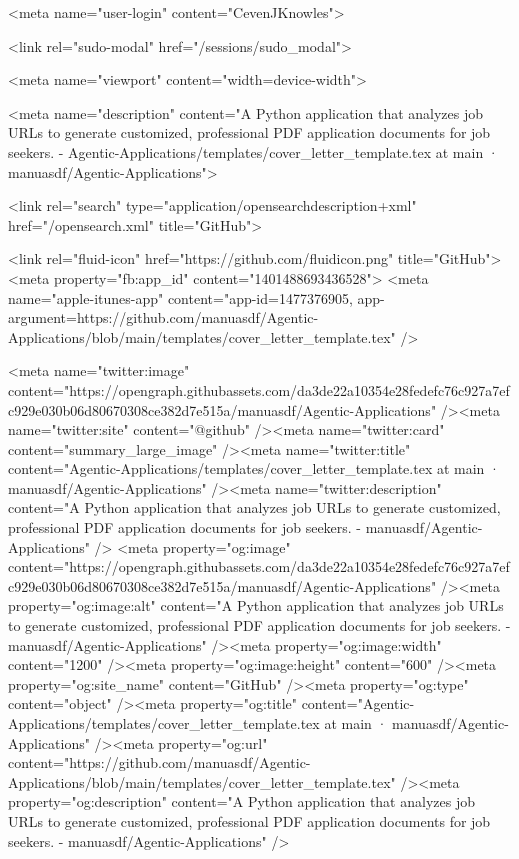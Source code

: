   




    <meta name="user-login" content="CevenJKnowles">

  <link rel="sudo-modal" href="/sessions/sudo_modal">

    <meta name="viewport" content="width=device-width">

    

      <meta name="description" content="A Python application that analyzes job URLs to generate customized, professional PDF application documents for job seekers. - Agentic-Applications/templates/cover_letter_template.tex at main · manuasdf/Agentic-Applications">

      <link rel="search" type="application/opensearchdescription+xml" href="/opensearch.xml" title="GitHub">

    <link rel="fluid-icon" href="https://github.com/fluidicon.png" title="GitHub">
    <meta property="fb:app_id" content="1401488693436528">
    <meta name="apple-itunes-app" content="app-id=1477376905, app-argument=https://github.com/manuasdf/Agentic-Applications/blob/main/templates/cover_letter_template.tex" />

      <meta name="twitter:image" content="https://opengraph.githubassets.com/da3de22a10354e28fedefc76c927a7efc929e030b06d80670308ce382d7e515a/manuasdf/Agentic-Applications" /><meta name="twitter:site" content="@github" /><meta name="twitter:card" content="summary_large_image" /><meta name="twitter:title" content="Agentic-Applications/templates/cover_letter_template.tex at main · manuasdf/Agentic-Applications" /><meta name="twitter:description" content="A Python application that analyzes job URLs to generate customized, professional PDF application documents for job seekers. - manuasdf/Agentic-Applications" />
  <meta property="og:image" content="https://opengraph.githubassets.com/da3de22a10354e28fedefc76c927a7efc929e030b06d80670308ce382d7e515a/manuasdf/Agentic-Applications" /><meta property="og:image:alt" content="A Python application that analyzes job URLs to generate customized, professional PDF application documents for job seekers. - manuasdf/Agentic-Applications" /><meta property="og:image:width" content="1200" /><meta property="og:image:height" content="600" /><meta property="og:site_name" content="GitHub" /><meta property="og:type" content="object" /><meta property="og:title" content="Agentic-Applications/templates/cover_letter_template.tex at main · manuasdf/Agentic-Applications" /><meta property="og:url" content="https://github.com/manuasdf/Agentic-Applications/blob/main/templates/cover_letter_template.tex" /><meta property="og:description" content="A Python application that analyzes job URLs to generate customized, professional PDF application documents for job seekers. - manuasdf/Agentic-Applications" />
  



